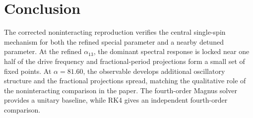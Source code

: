 \documentclass[11pt,a4paper]{article}
\begin{document}
\section{Conclusion}

The corrected noninteracting reproduction verifies the central single-spin mechanism for both the refined special parameter and a nearby detuned parameter. At the refined \(\alpha_{13}\), the dominant spectral response is locked near one half of the drive frequency and fractional-period projections form a small set of fixed points. At \(\alpha=81.60\), the observable develops additional oscillatory structure and the fractional projections spread, matching the qualitative role of the noninteracting comparison in the paper. The fourth-order Magnus solver provides a unitary baseline, while RK4 gives an independent fourth-order comparison.
\end{document}
